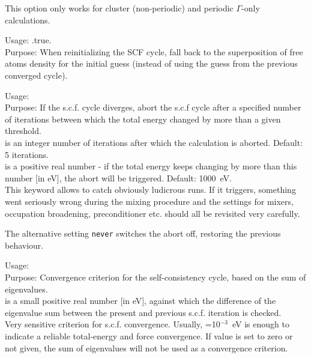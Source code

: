 This option only works for cluster (non-periodic) and periodic
$\Gamma$-only calculations. 

{
  \noindent
  Usage:  .true. \\[1.0ex]
  Purpose: When reinitializing the SCF cycle, fall back
           to the superposition of free atoms density for
           the initial guess (instead of using the guess from
           the previous converged cycle). \\[1.0ex]
}

{
  \noindent
  Usage:    \\[1.0ex]
  Purpose: If the s.c.f. cycle diverges, abort the s.c.f cycle after a
  specified number of iterations between which the total energy changed
  by more than a given threshold.\\[1.0ex]
   is an integer number of iterations after which the
  calculation is aborted. Default: 5 iterations. \\[1.0ex]
   is a positive real number - if the total energy
  keeps changing by more than this number [in eV], the abort will be 
  triggered. Default: 1000~eV.\\
}
This keyword allows to catch obviously ludicrous runs. If it triggers,
something went seriously wrong during the mixing procedure and the
settings for mixers, occupation broadening, preconditioner etc. should
all be revisited very carefully. 

The alternative setting  \texttt{never}
switches the abort off, restoring the previous behaviour.

{
  \noindent
  Usage:   \\[1.0ex]
  Purpose: Convergence criterion for the self-consistency cycle, based
    on the sum of eigenvalues. \\[1.0ex]
   is a small positive real number [in eV], against
  which the difference of the eigenvalue sum between the present and
  previous s.c.f. iteration is checked. \\
}
Very sensitive criterion for s.c.f. convergence. Usually,
=10$^{-3}$~eV is enough to indicate a
reliable total-energy and force convergence. If value is set to zero or
not given, the sum of eigenvalues will not be used as a convergence
criterion. 

